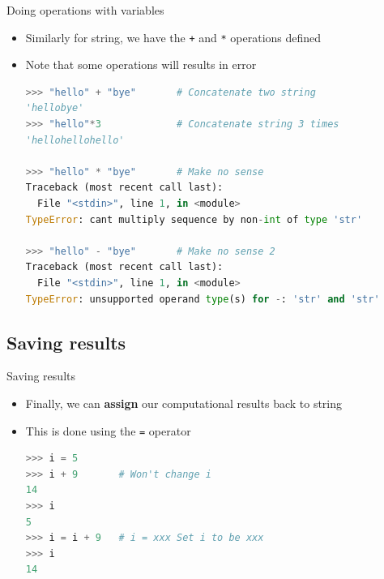 \documentclass[10pt,xcolor={table,dvipsnames},t]{beamer}
\begin{document}
\begin{frame}[fragile]{Doing operations with variables}
  \begin{itemize}
    \item Similarly for string, we have the \texttt{+} and \texttt{*} operations defined 
    \item Note that some operations will results in error
\begin{lstlisting}[language=python]
>>> "hello" + "bye"       # Concatenate two string 
'hellobye'
>>> "hello"*3             # Concatenate string 3 times
'hellohellohello' 

>>> "hello" * "bye"       # Make no sense
Traceback (most recent call last):
  File "<stdin>", line 1, in <module>
TypeError: cant multiply sequence by non-int of type 'str'

>>> "hello" - "bye"       # Make no sense 2
Traceback (most recent call last):
  File "<stdin>", line 1, in <module>
TypeError: unsupported operand type(s) for -: 'str' and 'str'
\end{lstlisting}
  \end{itemize}
\end{frame}

\subsection{Saving results}
\begin{frame}[fragile]{Saving results}
  \begin{itemize}
    \item Finally, we can \textbf{assign} our computational results back to string
    \item This is done using the \texttt{=} operator
\begin{lstlisting}[language=python]
>>> i = 5
>>> i + 9       # Won't change i
14
>>> i
5
>>> i = i + 9   # i = xxx Set i to be xxx
>>> i
14
\end{lstlisting}
  \end{itemize}
\end{frame}

\end{document}
